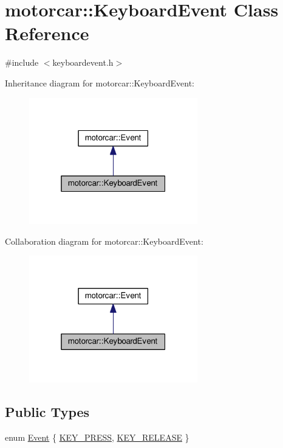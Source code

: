 \hypertarget{classmotorcar_1_1KeyboardEvent}{\section{motorcar\-:\-:Keyboard\-Event Class Reference}
\label{classmotorcar_1_1KeyboardEvent}
}


{\ttfamily \#include $<$keyboardevent.\-h$>$}



Inheritance diagram for motorcar\-:\-:Keyboard\-Event\-:
\nopagebreak
\begin{figure}[H]
\begin{center}
\leavevmode
\includegraphics[width=208pt]{classmotorcar_1_1KeyboardEvent__inherit__graph}
\end{center}
\end{figure}


Collaboration diagram for motorcar\-:\-:Keyboard\-Event\-:
\nopagebreak
\begin{figure}[H]
\begin{center}
\leavevmode
\includegraphics[width=208pt]{classmotorcar_1_1KeyboardEvent__coll__graph}
\end{center}
\end{figure}
\subsection*{Public Types}
\begin{DoxyCompactItemize}
\item 
enum \hyperlink{classmotorcar_1_1KeyboardEvent_a160494213466e8fd37ad7b84f0246df6}{Event} \{ \hyperlink{classmotorcar_1_1KeyboardEvent_a160494213466e8fd37ad7b84f0246df6a76edf2c02e4795738cfebfa7d46f499c}{K\-E\-Y\-\_\-\-P\-R\-E\-S\-S}, 
\hyperlink{classmotorcar_1_1KeyboardEvent_a160494213466e8fd37ad7b84f0246df6a592f2e816c45ea3722c81bf7e8aab187}{K\-E\-Y\-\_\-\-R\-E\-L\-E\-A\-S\-E}
 \}
\end{DoxyCompactItemize}
